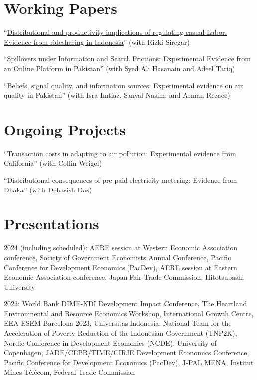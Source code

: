 \documentclass[10pt]{res} %
\begin{document}
\begin{resume}
		\section{Working Papers}
		\hangindent=0.7cm ``{\href{https://shotaro-n-nakamura.github.io/img/Nakamura_JMP_Latest.pdf}{Distributional and productivity implications of regulating casual Labor: Evidence from ridesharing in Indonesia}}'' (with Rizki Siregar)
		
		\hangindent=0.7cm ``{Spillovers under Information and Search Frictions: Experimental Evidence from an Online Platform in Pakistan}'' (with Syed Ali Hasanain and Adeel Tariq) 
		
		\hangindent=0.7cm ``{Beliefs, signal quality, and information sources: Experimental evidence on air quality in Pakistan}'' (with Isra Imtiaz, Sanval Nasim, and Arman Rezaee)
		\vspace{-\baselineskip} 
		\section{Ongoing Projects}
		\hangindent=0.7cm ``{Transaction costs in adapting to air pollution: Experimental evidence from California}'' (with Collin Weigel)
		
		\hangindent=0.7cm ``{Distributional consequences of pre-paid electricity metering: Evidence from Dhaka}'' (with Debasish Das)
		
		\section{Presentations}
		\hangindent=0.7cm 2024 (including scheduled):  AERE session at Western Economic Association conference, Society of Government Economists Annual Conference, Pacific Conference for Development Economics (PacDev), AERE session at Eastern Economic Association conference, Japan Fair Trade Commission, Hitotsubashi University
		
		\hangindent=0.7cm 2023: World Bank DIME-KDI Development Impact Conference, The Heartland Environmental and Resource Economics Workshop, International Growth Centre, EEA-ESEM Barcelona 2023, Universitas Indonesia, National Team for the Acceleration of Poverty Reduction of the Indonesian Government (TNP2K), Nordic Conference in Development Economics (NCDE), University of Copenhagen, JADE/CEPR/TIME/CIRJE Development Economics Conference, Pacific Conference for Development Economics (PacDev), J-PAL MENA, Institut Mines-T\'{e}l\'{e}com, Federal Trade Commission
		

\end{resume}
\end{document}
